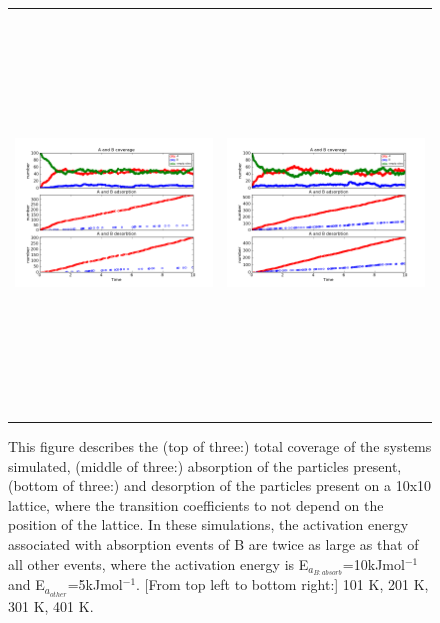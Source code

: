 \documentclass[11pt]{article}
\begin{document}
\begin{figure}[h!]
\begin{tabular}{cc}
\includegraphics[width=3.5in, height=4.2in]{./coadsorb/AtoBcoadsorb10x10_301_Babs2x__EA5E3_EB10E3_1.png} &
\includegraphics[width=3.5in, height=4.2in]{./coadsorb/AtoBcoadsorb10x10_401_Babs2x__EA5E3_EB10E3_1.png} 
\end{tabular}
\caption{This figure describes the (top of three:) total coverage of the systems simulated, (middle of three:) absorption of the particles present, (bottom of three:) and desorption of the particles present on a 10x10 lattice, where the transition coefficients to not depend on the position of the lattice. In these simulations, the activation energy associated with absorption events of B are twice as large as that of all other events, where the activation energy is E$_{a_{B:absorb}}$=10kJmol$^{-1}$ and E$_{a_{other}}$=5kJmol$^{-1}$. [From top left to bottom right:] 101 K, 201 K, 301 K, 401 K. }
\end{figure}
\end{document}
